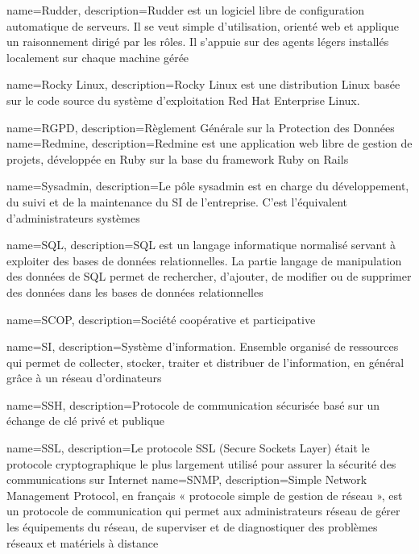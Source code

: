 {
    name=Rudder,
    description={Rudder est un logiciel libre de configuration automatique de serveurs. Il se veut simple d'utilisation, orienté web et applique un raisonnement dirigé par les rôles. Il s'appuie sur des agents légers installés localement sur chaque machine gérée}
}

{
    name=Rocky Linux,
    description={Rocky Linux est une distribution Linux basée sur le code source du système d'exploitation Red Hat Enterprise Linux.}
}

{
    name=RGPD,
    description={Règlement Générale sur la Protection des Données}
}
{
    name=Redmine,
    description={Redmine est une application web libre de gestion de projets, développée en Ruby sur la base du framework Ruby on Rails}
}

{
    name=Sysadmin,
    description={Le pôle sysadmin est en charge du développement, du suivi et de la maintenance du SI de l'entreprise. C'est l'équivalent d'administrateurs systèmes}
}

{
    name=SQL,
    description={SQL est un langage informatique normalisé servant à exploiter des bases de données relationnelles. La partie langage de manipulation des données de SQL permet de rechercher, d'ajouter, de modifier ou de supprimer des données dans les bases de données relationnelles}
}

{
    name=SCOP,
    description={Société coopérative et participative}
}

{
    name=SI,
    description={Système d'information. Ensemble organisé de ressources qui permet de collecter, stocker, traiter et distribuer de l'information, en général grâce à un réseau d'ordinateurs}
}

{
    name=SSH,
    description={Protocole de communication sécurisée basé sur un échange de clé privé et publique}
}

{
    name=SSL,
    description={Le protocole SSL (Secure Sockets Layer) était le protocole cryptographique le plus largement utilisé pour assurer la sécurité des communications sur Internet}
}
{
    name=SNMP,
    description={Simple Network Management Protocol, en français « protocole simple de gestion de réseau », est un protocole de communication qui permet aux administrateurs réseau de gérer les équipements du réseau, de superviser et de diagnostiquer des problèmes réseaux et matériels à distance}
}

